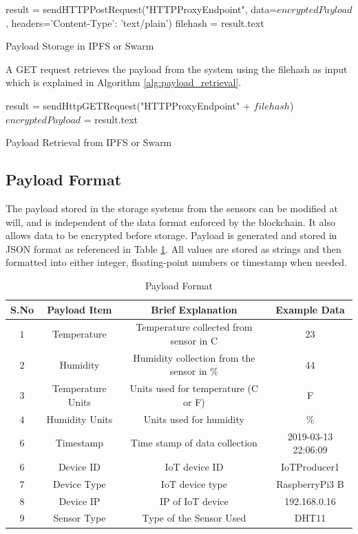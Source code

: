 \documentclass[11pt,openright]{report}
\begin{document}
\begin{algorithm}[setSwarmOrIPFSData]
  result = sendHTTPPostRequest("HTTPProxyEndpoint", data=$encryptedPayload$, headers={'Content-Type': 'text/plain'})\;
  filehash = result.text\;
 \caption{Payload Storage in IPFS or Swarm}
 \label{alg:payload_storage}
\end{algorithm}

A GET request retrieves the payload from the system using the filehash as input which is explained in Algorithm \ref{alg:payload_retrieval}.

\begin{algorithm}[getSwarmOrIPFSData]
  result = sendHttpGETRequest("HTTPProxyEndpoint" + $filehash$)\;
  $encryptedPayload$ = result.text\;
 \caption{Payload Retrieval from IPFS or Swarm}
 \label{alg:payload_retrieval}
\end{algorithm}

\subsection{Payload Format}
The payload stored in the storage systems from the sensors can be modified at will, and is independent of the data format enforced by the blockchain. It also allows data to be encrypted before storage. Payload is generated and stored in JSON format as referenced in Table \ref{payload_format}. All values are stored as strings and then formatted into either integer, floating-point numbers or timestamp when needed.
\newpage

\begin{table}[!htbp]
	\renewcommand{\arraystretch}{1.3}
	\caption{Payload Format}
	\label{payload_format}
	\centering
	\begin{tabular}{|c|c|c|c|}
		\hline
		\bfseries S.No & \bfseries Payload Item & \bfseries Brief Explanation & \bfseries Example Data \\
		\hline\hline
		$1$ & Temperature & Temperature collected from sensor in C & 23 \\ \hline
		$2$ & Humidity & Humidity collection from the sensor in \% & 44 \\ \hline
		$3$ & Temperature Units & Units used for temperature (C or F) & F \\ \hline
		$4$ & Humidity Units & Units used for humidity & \% \\ \hline
		$6$ & Timestamp & Time stamp of data collection & 2019-03-13 22:06:09 \\ \hline
		$6$ & Device ID & IoT device ID & IoTProducer1 \\ \hline
		$7$ & Device Type & IoT device type & RaspberryPi3 B \\ \hline
		$8$ & Device IP & IP of IoT device& 192.168.0.16 \\ \hline
		$9$ & Sensor Type & Type of the Sensor Used & DHT11 \\ \hline
	\end{tabular}
\end{table}
\end{document}
